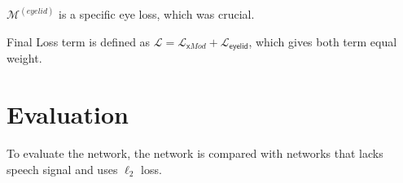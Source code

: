 \documentclass[10pt,twocolumn,letterpaper]{article}
\begin{document}
      \(\mathcal{M}^{(eyelid)}\) is a specific eye loss, which was crucial.
      
      Final Loss term is defined as \(\mathcal{L} =\mathcal{L}_{\mathsf{x}Mod}+\mathcal{L}_{\mathsf{eyelid}} \), which gives both term equal weight.
  \section{Evaluation}
    To evaluate the network, the network is compared with  networks that lacks speech signal and uses \(\ell_2\) loss.
     \cite{Cudeiro_2019_CVPR}
      
    

{
  \small
  
  
}
\end{document}
